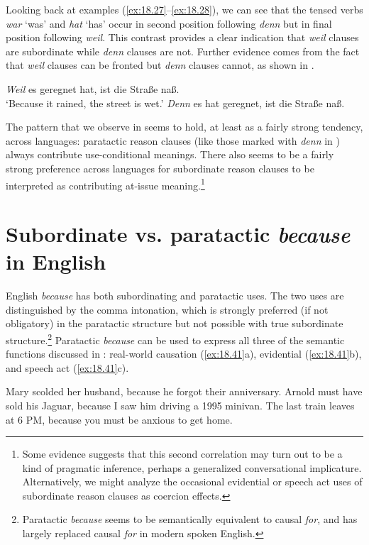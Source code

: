 Looking back at examples (\ref{ex:18.27}--\ref{ex:18.28}), we can see that the tensed verbs \textit{war} ‘was’ and \textit{hat} ‘has’ occur in second position following \textit{denn} but in final position following \textit{weil}. This contrast provides a clear indication that \textit{weil} clauses are subordinate while \textit{denn} clauses are not. Further evidence comes from the fact that \textit{weil} clauses can be fronted but \textit{denn} clauses cannot, as shown in . 

\largerpage
\ea \label{ex:18.32}
\ea  \textit{Weil} es geregnet hat, ist die Straße naß.\\
\glt ‘Because it rained, the street is wet.’
\ex *\textit{Denn} es hat geregnet, ist die Straße naß.\\
\z \z


The pattern that we observe in  seems to hold, at least as a fairly strong tendency, across languages: paratactic reason clauses (like those marked with \textit{denn} in ) always contribute use-conditional meanings. There also seems to be a fairly strong preference across languages for subordinate reason clauses to be interpreted as contributing at-issue meaning.\footnote{Some evidence suggests that this second correlation may turn out to be a kind of pragmatic inference, perhaps a generalized conversational implicature. Alternatively, we might analyze the occasional evidential or speech act uses of subordinate reason clauses as coercion effects.}



\section{Subordinate vs. paratactic \textit{because} in English}\label{sec:18.4}


English \textit{because} has both subordinating and paratactic uses. The two uses are distinguished by the comma intonation, which is strongly preferred (if not obligatory) in the paratactic structure but not possible with true subordinate structure.\footnote{Paratactic \textit{because} seems to be semantically equivalent to causal \textit{for}, and has largely replaced causal \textit{for} in modern spoken English.}  Paratactic \textit{because} can be used to express all three of the semantic functions discussed in : real-world causation (\ref{ex:18.41}a), evidential (\ref{ex:18.41}b), and speech act (\ref{ex:18.41}c).


\ea \label{ex:18.41}
\ea  Mary scolded her husband, because he forgot their anniversary.
\ex Arnold must have sold his Jaguar, because I saw him driving a 1995 minivan.
\ex The last train leaves at 6 PM, because you must be anxious to get home.
                       \z
\z


